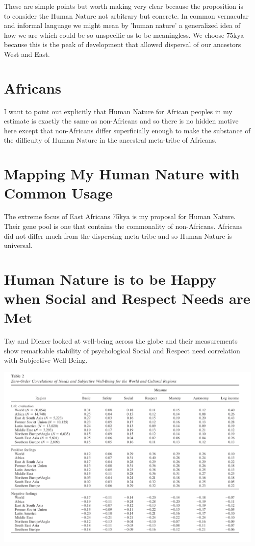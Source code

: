 \documentclass{amsart}
\begin{document}
These are simple points but worth making very clear because the proposition is to consider the Human Nature not arbitrary but concrete.  In common vernacular and informal language we might mean by 'human nature' a generalized idea of how we are which could be so unspecific as to be meaningless.  We choose 75kya because this is the peak of development that allowed dispersal of our ancestors West and East.

\section{Africans}
I want to point out explicitly that Human Nature for African peoples in my estimate is exactly the same as non-Africans and so there is no hidden motive here except that non-Africans differ superficially enough to make the substance of the difficulty of Human Nature in the ancestral meta-tribe of Africans.

\section{Mapping My Human Nature with Common Usage}
The extreme focus of East Africans 75kya is my proposal for Human Nature.  Their gene pool is one that contains the commonality of non-Africans.  Africans did not differ much from the dispersing meta-tribe and so Human Nature is universal.

\section{Human Nature is to be Happy when Social and Respect Needs are Met}

Tay and Diener looked at well-being across the globe and their measurements show remarkable stability of psychological Social and Respect need correlation with Subjective Well-Being.

\includegraphics[scale=0.35]{wbneeds.png}
\end{document}
